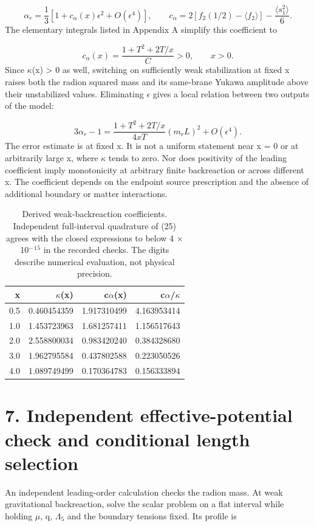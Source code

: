 \documentclass[11pt]{article}
\begin{document}
\begin{equation}
\alpha_r=\frac13\left[1+c_\alpha(x)\epsilon^2+O(\epsilon^4)\right],\qquad c_\alpha=2[f_2(1/2)-\langle f_2\rangle]-\frac{\langle s_1^2\rangle}{6}.\tag{25}
\end{equation}
The elementary integrals listed in Appendix A simplify this coefficient to

\begin{equation}
c_\alpha(x)=\frac{1+T^2+2T/x}{C}>0,\qquad x>0.\tag{26}
\end{equation}
Since \(\kappa\)(x) > 0 as well, switching on sufficiently weak stabilization at fixed x raises both the radion squared mass and its same-brane Yukawa amplitude above their unstabilized values. Eliminating \(\epsilon\) gives a local relation between two outputs of the model:

\begin{equation}
3\alpha_r-1=\frac{1+T^2+2T/x}{4xT}(m_rL)^2+O(\epsilon^4).\tag{27}
\end{equation}
The error estimate is at fixed x. It is not a uniform statement near x = 0 or at arbitrarily large x, where \(\kappa\) tends to zero. Nor does positivity of the leading coefficient imply monotonicity at arbitrary finite backreaction or across different x. The coefficient depends on the endpoint source prescription and the absence of additional boundary or matter interactions.

\begin{table}[htbp]
\centering
\small
\begin{tabular}{rrrr}
\toprule
x & \(\kappa\)(x) & c\(\alpha\)(x) & c\(\alpha\)/\(\kappa\)\\
\midrule
0.5 & 0.460454359 & 1.917310499 & 4.163953414\\
1.0 & 1.453723963 & 1.681257411 & 1.156517643\\
2.0 & 2.558800034 & 0.983420240 & 0.384328680\\
3.0 & 1.962795584 & 0.437802588 & 0.223050526\\
4.0 & 1.089749499 & 0.170364783 & 0.156333894\\
\bottomrule
\end{tabular}
\caption{Derived weak-backreaction coefficients. Independent full-interval quadrature of (25) agrees with the closed expressions to below 4 \(\times\) 10\({}^-\)\({}^1\)\({}^5\) in the recorded checks. The digits describe numerical evaluation, not physical precision.}
\end{table}
\section*{7. Independent effective-potential check and conditional length selection}
An independent leading-order calculation checks the radion mass. At weak gravitational backreaction, solve the scalar problem on a flat interval while holding \(\mu\), q, \(\Lambda\)\({}_5\) and the boundary tensions fixed. Its profile is
\end{document}

